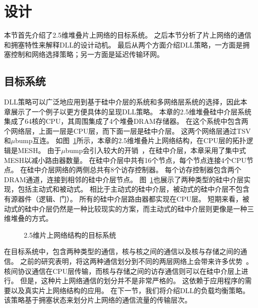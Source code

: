 \section{设计}
\label{sec:dlldesign}

本节首先介绍了2.5维堆叠片上网络的目标系统。
之后本节分析了片上网络的通信和拥塞特性来解释DLL的设计动机。
最后从两个方面介绍DLL策略，一方面是拥塞控制和网络选择策略；另一方面是延迟传输环网。

\subsection{目标系统}
\label{sec:dlltarget}

DLL策略可以广泛地应用到基于硅中介层的系统和多网络层系统的选择，因此本章展示了一个例子以更方便具体的呈现DLL策略。
本章的2.5维堆叠硅中介层系统集成了64核的CPU，其周围集成了4个堆叠DRAM存储器。
在这个系统中包含两个网络层，上面一层是CPU层，而下面一层是硅中介层。
这两个网络层通过TSV和$\mu$bump互连。
如图~\ref{fig:target_system}所示，本章的2.5维堆叠片上网络结构，在CPU层的拓扑逻辑是MESH。
由于$\mu$bump会引入较大的开销~，在硅中介层，本章采用了集中式MESH以减小路由器数量。
在硅中介层中共有16个节点，每个节点连接4个CPU节点。
在硅中介层网络的两侧总共有8个访存控制器。
每个访存控制器包含两个DRAM通道，连接到相邻的硅中介层节点。
图~\ref{fig:target_system}也展示了两种类型的硅中介层实现，包括主动式和被动式。
相比于主动式的硅中介层，被动式的硅中介层不包含有源器件（逻辑、门）。
所有的硅中介层路由器都实现在CPU层。
短期来看，被动式的硅中介层仍然是一种比较现实的方案，而主动式的硅中介层则更像是一种三维堆叠的方式。

\begin{figure}[htb]
\centering
{} \qquad
{} \qquad
{}  
\caption{2.5维片上网络结构的目标系统}
\label{fig:target_system}
\end{figure}

在目标系统中，包含两种类型的通信，核与核之间的通信以及核与存储之间的通信。
之前的研究表明，将这两种通信划分到不同的两层网络上会带来许多优势~。
核间协议通信在CPU层传输，而核与存储之间的访存通信则可以在硅中介层上进行。
但是，这种片上网络通信的划分并不是非常严格的。
这依赖于应用程序的需要以及真实片上网络结构的应用。
在下一节，我们将介绍DLL的负载均衡策略。
该策略基于拥塞状态来划分片上网络的通信流量的传输层次。


